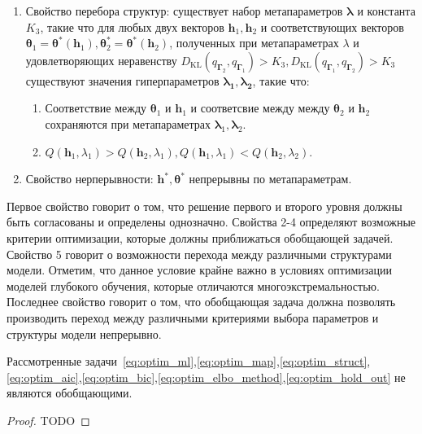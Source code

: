 \begin{defin}
\begin{enumerate}
\item Свойство перебора структур: существует набор метапараметров $\boldsymbol{\lambda}$ и константа $K_3$, такие что для любых двух векторов $\mathbf{h}_{1}, \mathbf{h}_2$ и соответствующих векторов $\boldsymbol{\theta}_1 = \boldsymbol{\theta}^{*}(\mathbf{h}_1),\boldsymbol{\theta}_2^{*}= \boldsymbol{\theta}^{*}(\mathbf{h}_2)$, полученных при метапараметрах $\lambda$ и удовлетворяющих неравенству $D_\text{KL}(q_{\boldsymbol{\Gamma}_2}, q_{\boldsymbol{\Gamma}_1})>K_3, D_\text{KL}(q_{\boldsymbol{\Gamma}_1}, q_{\boldsymbol{\Gamma}_2})>K_3$  существуют значения гиперпараметров $\boldsymbol{\lambda_1},\boldsymbol{\lambda_2}$, такие что:
\begin{enumerate}
\item Соответствие между $\boldsymbol{\theta}_1$ и $\mathbf{h}_1$ и соответсвие между  между $\boldsymbol{\theta}_2$ и $\mathbf{h}_2$ сохраняются при метапараметрах $\boldsymbol{\lambda}_1, \boldsymbol{\lambda}_2$.
\item $Q(\mathbf{h}_1, \lambda_1) > Q(\mathbf{h}_2, \lambda_1), Q(\mathbf{h}_1, \lambda_1) < Q(\mathbf{h}_2, \lambda_2)$.
\end{enumerate}  

\item Свойство нерперывности: $\mathbf{h}^{*}, \boldsymbol{\theta}^{*}$ непрерывны по метапараметрам.
\end{enumerate}
\end{defin}
Первое свойство говорит о том, что решение первого и второго уровня должны быть согласованы и определены однозначно.
Свойства 2-4 определяют возможные критерии оптимизации, которые должны приближаться обобщающей задачей.
Свойство 5 говорит о возможности перехода между различными структурами модели. Отметим, что данное условие крайне важно в условиях оптимизации моделей глубокого обучения, которые отличаются многоэкстремальностью.
Последнее свойство говорит о том, что обобщающая задача должна позволять производить переход между различными критериями выбора  параметров и структуры модели непрерывно.

\begin{theorem}Рассмотренные задачи~\eqref{eq:optim_ml},\eqref{eq:optim_map},\eqref{eq:optim_struct},\eqref{eq:optim_aic},\eqref{eq:optim_bic},\eqref{eq:optim_elbo_method},\eqref{eq:optim_hold_out} не являются обобщающими.
\end{theorem}
\begin{proof}
TODO
\end{proof}

